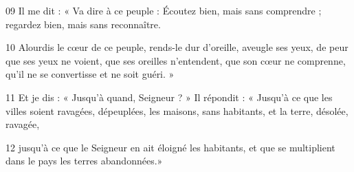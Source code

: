 
09 Il me dit : « Va dire à ce peuple : Écoutez bien, mais sans comprendre ; regardez bien, mais sans reconnaître.

10 Alourdis le cœur de ce peuple, rends-le dur d’oreille, aveugle ses yeux, de peur que ses yeux ne voient, que ses oreilles n’entendent, que son cœur ne comprenne, qu’il ne se convertisse et ne soit guéri. »

11 Et je dis : « Jusqu’à quand, Seigneur ? » Il répondit : « Jusqu’à ce que les villes soient ravagées, dépeuplées, les maisons, sans habitants, et la terre, désolée, ravagée,

12 jusqu’à ce que le Seigneur en ait éloigné les habitants, et que se multiplient dans le pays les terres abandonnées.»